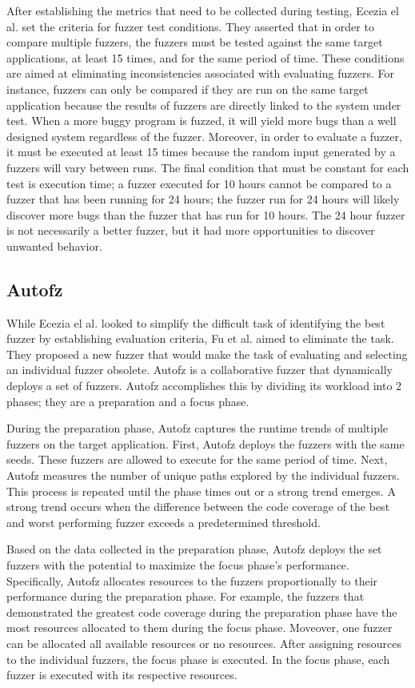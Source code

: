 After establishing the metrics that need to be collected during testing, Ecezia el al. set the criteria for fuzzer test conditions. They asserted that in order to compare multiple fuzzers, the fuzzers must be tested against the same target applications, at least 15 times, and for the same period of time. These conditions are aimed at eliminating inconsistencies associated with evaluating fuzzers. For instance, fuzzers can only be compared if they are run on the same target application because the results of fuzzers are directly linked to the system under test. When a more buggy program is fuzzed, it will yield more bugs than a well designed system regardless of the fuzzer. Moreover, in order to evaluate a fuzzer, it must be executed at least 15 times because the random input generated by a fuzzers will vary between runs. The final condition that must be constant for each test is execution time; a fuzzer executed for 10 hours cannot be compared to a fuzzer that has been running for 24 hours; the fuzzer run for 24 hours will likely discover more bugs than the fuzzer that has run for 10 hours. The 24 hour fuzzer is not necessarily a better fuzzer, but it had more opportunities to discover unwanted behavior. \cite{Ecezia}

\subsection{Autofz}
While Ecezia el al. looked to simplify the difficult task of identifying the best fuzzer by establishing evaluation criteria, Fu et al. aimed to eliminate the task. They proposed a new fuzzer that would make the task of evaluating and selecting an individual fuzzer obsolete. Autofz is a collaborative fuzzer that dynamically deploys a set of fuzzers. Autofz accomplishes this by dividing its workload into 2 phases; they are a preparation and a focus phase. 

During the preparation phase, Autofz captures the runtime trends of multiple fuzzers on the target application. First, Autofz deploys the fuzzers with the same seeds. These fuzzers are allowed to execute for the same period of time. Next, Autofz measures the number of unique paths explored by the individual fuzzers. This process is repeated until the phase times out or a strong trend emerges. A strong trend occurs when the difference between the code coverage of the best and worst performing fuzzer exceeds a predetermined threshold. 

Based on the data collected in the preparation phase, Autofz deploys the set fuzzers with the potential to maximize the focus phase’s performance. Specifically, Autofz allocates resources to the fuzzers proportionally to their performance during the preparation phase. For example, the fuzzers that demonstrated the greatest code coverage during the preparation phase have the most resources allocated to them during the focus phase. Moveover, one fuzzer can be allocated all available resources or no resources. After assigning resources to the individual fuzzers, the focus phase is executed. In the focus phase, each fuzzer is executed with its respective resources.


